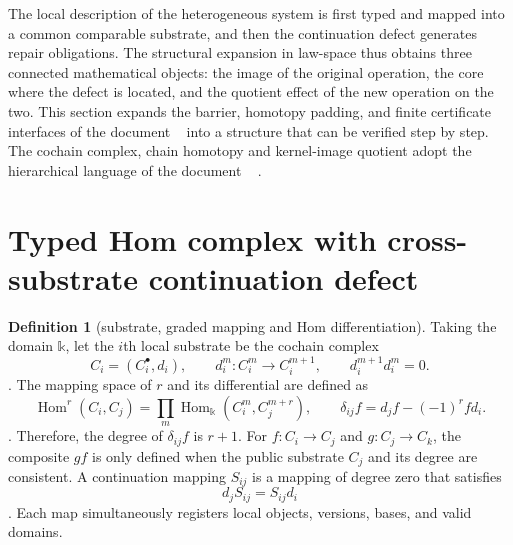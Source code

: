 \documentclass[12pt,a4paper,openany,notitlepage]{report}
\theoremstyle{plain}
\theoremstyle{definition}
\newtheorem{definition}[theorem]{Definition}
\theoremstyle{remark}
\begin{document}
\begin{CJK*}
\label{hgov:homology}

The local description of the heterogeneous system is first typed and mapped into a common comparable substrate, and then the continuation defect generates repair obligations. The structural expansion in law-space thus obtains three connected mathematical objects: the image of the original operation, the core where the defect is located, and the quotient effect of the new operation on the two. This section expands the barrier, homotopy padding, and finite certificate interfaces of the document ~ \cite{S01,S37,S38} into a structure that can be verified step by step. The cochain complex, chain homotopy and kernel-image quotient adopt the hierarchical language of the document ~ \cite{ExtWeibel,ExtStacks}.

\section { Typed Hom complex with cross-substrate continuation defect }\label{hgov:typed-hom}


\begin{definition}
[substrate, graded mapping and Hom differentiation]\label{hgov:def-hom}
Taking the domain $\mathbb k$, let the $i$th local substrate be the cochain complex \[
 C_i=(C_i^\bullet,d_i),\qquad
 d_i^m:C_i^m\longrightarrow C_i^{m+1},\qquad
 d_i^{m+1}d_i^m=0.
\]. The mapping space of $r$ and its differential are defined as \[
 \operatorname{Hom}^r(C_i,C_j)
 =\prod_m\operatorname{Hom}_{\mathbb k}(C_i^m,C_j^{m+r}),
 \qquad
 \delta_{ij}f=d_jf-(-1)^rfd_i.
\]. Therefore, the degree of $\delta_{ij}f$ is $r+1$. For $f:C_i\to C_j$ and $g:C_j\to C_k$, the composite $gf$ is only defined when the public substrate $C_j$ and its degree are consistent. A continuation mapping $S_{ij}$ is a mapping of degree zero that satisfies \[
 d_jS_{ij}=S_{ij}d_i
\]. Each map simultaneously registers local objects, versions, bases, and valid domains.\end{definition}



\end{CJK*}
\end{document}
